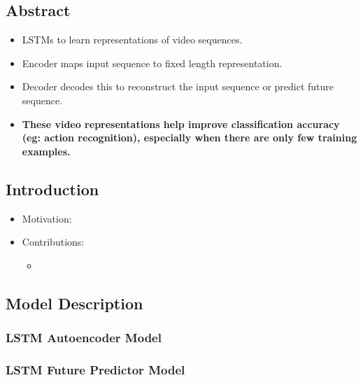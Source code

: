 \documentclass{article}
\begin{document}
    \subsection*{Abstract}
    \begin{itemize}
        \item LSTMs to learn representations of video sequences.
        \item Encoder maps input sequence to fixed length representation.
        \item Decoder decodes this to reconstruct the input sequence or predict future sequence.
        \item \textbf{These video representations help improve classification accuracy (eg: action recognition), especially when there are only few training examples.}
    \end{itemize}

    \subsection{Introduction}\label{subsec:Unsupervised_Learning_of_Video_Representations_using_LSTMs:introduction}
    \begin{itemize}
        \item Motivation:
        \item Contributions:
        \begin{itemize}
            \item
        \end{itemize}
    \end{itemize}

    \subsection{Model Description}\label{subsec:Unsupervised_Learning_of_Video_Representations_using_LSTMs:model-description}

    \subsubsection{LSTM Autoencoder Model}\label{subsubsec:Unsupervised_Learning_of_Video_Representations_using_LSTMs:lstm-autoencoder-model}

    \subsubsection{LSTM Future Predictor Model}\label{subsubsec:Unsupervised_Learning_of_Video_Representations_using_LSTMs:lstm-future-predictor-model}
\end{document}
